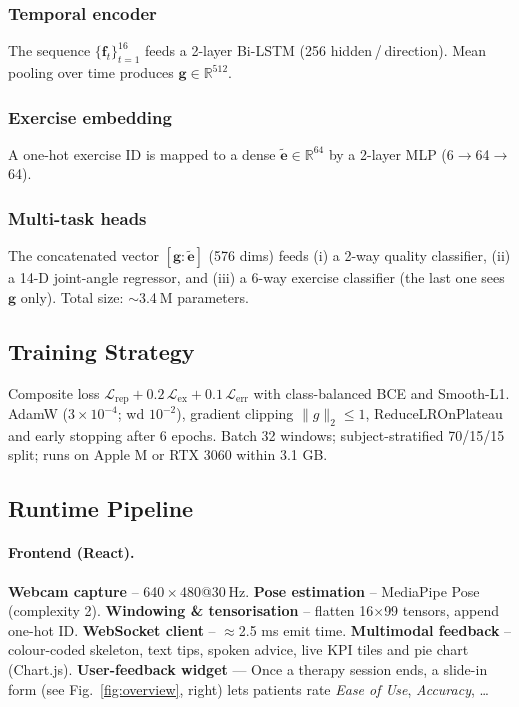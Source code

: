 \documentclass{article}
\begin{document}
\subsubsection{Temporal encoder}
The sequence $\{\mathbf f_t\}_{t=1}^{16}$ feeds a 2-layer Bi-LSTM
(256 hidden / direction).  Mean pooling over time produces
$\mathbf g\!\in\!\mathbb{R}^{512}$.

\subsubsection{Exercise embedding}
A one-hot exercise ID is mapped to a dense
$\tilde{\mathbf e}\!\in\!\mathbb{R}^{64}$ by a 2-layer MLP
(6$\!\to$64$\!\to$64).

\subsubsection{Multi-task heads}
The concatenated vector
$[\mathbf g : \tilde{\mathbf e}]$ (576 dims) feeds  
(i) a 2-way quality classifier,  
(ii) a 14-D joint-angle regressor, and  
(iii) a 6-way exercise classifier (the last one sees $\mathbf g$ only).  
Total size: $\sim$3.4 M parameters.

\subsection{Training Strategy}
Composite loss  
$\mathcal L_{\text{rep}}
 + 0.2\,\mathcal L_{\text{ex}}
 + 0.1\,\mathcal L_{\text{err}}$  
with class-balanced BCE and Smooth-L1.  
AdamW ($3{\times}10^{-4}$; wd $10^{-2}$), gradient clipping
$\lVert g\rVert_2\!\le\!1$, ReduceLROnPlateau and early stopping
after 6 epochs.  
Batch 32 windows; subject-stratified 70/15/15 split; runs on Apple M or
RTX 3060 within 3.1 GB.


\subsection{Runtime Pipeline}
\label{ssec:pipeline}

\paragraph{Frontend (React).}
\textbf{Webcam capture} – 640\,$\times$\,480@30 Hz.  
\textbf{Pose estimation} – MediaPipe Pose (complexity 2).  
\textbf{Windowing \& tensorisation} – flatten 16$\times$99 tensors,
append one-hot ID.  
\textbf{WebSocket client} – $\approx$2.5 ms emit time.  
\textbf{Multimodal feedback} – colour-coded skeleton, text tips, spoken
advice, live KPI tiles and pie chart (Chart.js).  
\textbf{User-feedback widget} — Once a therapy session ends, a slide-in
form (see Fig.~\ref{fig:overview}, right) lets patients rate
\emph{Ease of Use}, \emph{Accuracy}, …
\end{document}
